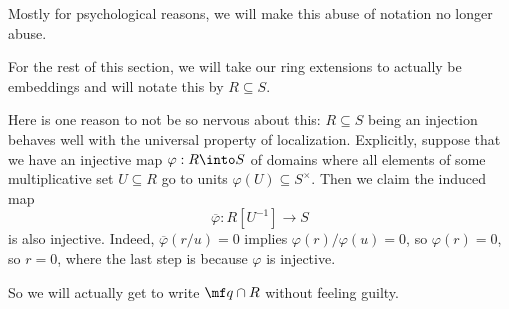 Mostly for psychological reasons, we will make this abuse of notation no longer abuse.
\begin{convention}
	For the rest of this section, we will take our ring extensions to actually be embeddings and will notate this by $R\subseteq S$.
\end{convention}
\begin{remark}[Nir] \label{rem:localizebasering}
	Here is one reason to not be so nervous about this: $R\subseteq S$ being an injection behaves well with the universal property of localization. Explicitly, suppose that we have an injective map $\varphi:R\into S$ of domains where all elements of some multiplicative set $U\subseteq R$ go to units $\varphi(U)\subseteq S^\times$. Then we claim the induced map
	\[\overline\varphi:R\left[U^{-1}\right]\to S\]
	is also injective. Indeed, $\overline\varphi(r/u)=0$ implies $\varphi(r)/\varphi(u)=0$, so $\varphi(r)=0$, so $r=0$, where the last step is because $\varphi$ is injective.
\end{remark}
So we will actually get to write $\mf q\cap R$ without feeling guilty.

